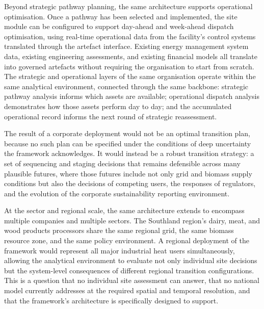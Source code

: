 \documentclass[
  11pt,
  a4paper,
  twoside,
  openright]{scrbook}
\begin{document}
Beyond strategic pathway planning, the same architecture supports
operational optimisation. Once a pathway has been selected and
implemented, the site module can be configured to support day-ahead and
week-ahead dispatch optimisation, using real-time operational data from
the facility's control systems translated through the artefact
interface. Existing energy management system data, existing engineering
assessments, and existing financial models all translate into governed
artefacts without requiring the organisation to start from scratch. The
strategic and operational layers of the same organisation operate within
the same analytical environment, connected through the same backbone:
strategic pathway analysis informs which assets are available;
operational dispatch analysis demonstrates how those assets perform day
to day; and the accumulated operational record informs the next round of
strategic reassessment.

The result of a corporate deployment would not be an optimal transition
plan, because no such plan can be specified under the conditions of deep
uncertainty the framework acknowledges. It would instead be a robust
transition strategy: a set of sequencing and staging decisions that
remains defensible across many plausible futures, where those futures
include not only grid and biomass supply conditions but also the
decisions of competing users, the responses of regulators, and the
evolution of the corporate sustainability reporting environment.

At the sector and regional scale, the same architecture extends to
encompass multiple companies and multiple sectors. The Southland
region's dairy, meat, and wood products processors share the same
regional grid, the same biomass resource zone, and the same policy
environment. A regional deployment of the framework would represent all
major industrial heat users simultaneously, allowing the analytical
environment to evaluate not only individual site decisions but the
system-level consequences of different regional transition
configurations. This is a question that no individual site assessment
can answer, that no national model currently addresses at the required
spatial and temporal resolution, and that the framework's architecture
is specifically designed to support.
\end{document}
